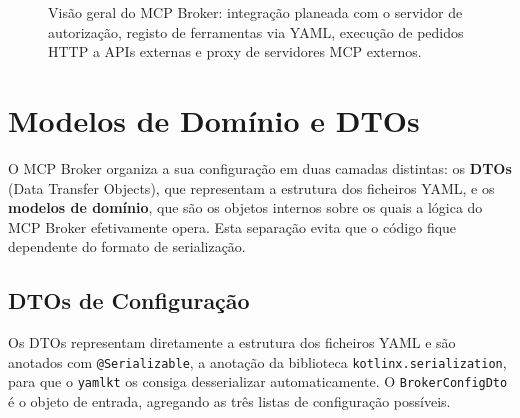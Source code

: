 \begin{figure}[H]
\caption{Visão geral do MCP Broker: integração planeada com o servidor de autorização, registo de ferramentas via YAML, execução de pedidos HTTP a APIs externas e proxy de servidores MCP externos.}
\label{fig:mcp-gateway-flow}
\end{figure}


\section{Modelos de Domínio e DTOs}

O MCP Broker organiza a sua configuração em duas camadas distintas: os \textbf{DTOs} (Data Transfer Objects), que representam a estrutura dos ficheiros YAML, e os \textbf{modelos de domínio}, que são os objetos internos sobre os quais a lógica do MCP Broker efetivamente opera. Esta separação evita que o código fique dependente do formato de serialização.

\subsection{DTOs de Configuração}

Os DTOs representam diretamente a estrutura dos ficheiros YAML e são anotados com \texttt{@Serializable}, a anotação da biblioteca \texttt{kotlinx.serialization}, para que o \texttt{yamlkt} os consiga desserializar automaticamente. O \texttt{BrokerConfigDto} é o objeto de entrada, agregando as três listas de configuração possíveis.

